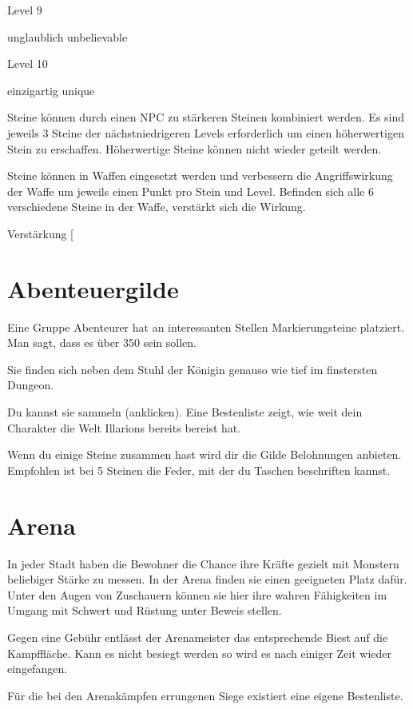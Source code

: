 \documentclass[a4paper,11pt]{book}
\begin{document}
Level 9

unglaublich unbelievable

Level 10

einzigartig  unique

Steine können durch einen NPC zu stärkeren Steinen kombiniert werden. Es sind jeweils 3 Steine der nächstniedrigeren Levels erforderlich um einen höherwertigen Stein zu erschaffen. Höherwertige Steine können nicht wieder geteilt werden.

Steine können in Waffen eingesetzt werden und verbessern die Angriffswirkung der Waffe um jeweils einen Punkt pro Stein und Level. Befinden sich alle 6 verschiedene Steine in der Waffe, verstärkt sich die Wirkung.

Verstärkung [%

\section{Abenteuergilde}

Eine Gruppe Abenteurer hat an interessanten Stellen Markierungsteine platziert. Man sagt, dass es über 350 sein sollen.

Sie finden sich neben dem Stuhl der Königin genauso wie tief im finstersten Dungeon.

Du kannst sie sammeln (anklicken). Eine Bestenliste zeigt, wie weit dein Charakter die Welt Illarions bereits bereist hat.

Wenn du einige Steine zusammen hast wird dir die Gilde Belohnungen anbieten. Empfohlen ist bei 5 Steinen die Feder, mit der du Taschen beschriften kannst.

\section{Arena}

In jeder Stadt haben die Bewohner die Chance ihre Kräfte gezielt mit Monstern beliebiger Stärke zu messen. In der Arena finden sie einen geeigneten Platz dafür. Unter den Augen von Zuschauern können sie hier ihre wahren Fähigkeiten im Umgang mit Schwert und Rüstung unter Beweis stellen.

Gegen eine Gebühr entlässt der Arenameister das entsprechende Biest auf die Kampffläche. Kann es nicht besiegt werden so wird es nach einiger Zeit wieder eingefangen.

Für die bei den Arenakämpfen errungenen Siege existiert eine eigene Bestenliste.
\end{document}
